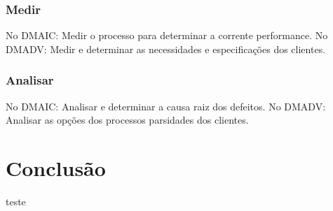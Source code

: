 \documentclass{abnt}
\begin{document}
				\subsection {Medir}
				No DMAIC: Medir o processo para determinar a corrente performance.
				No DMADV: Medir e determinar as necessidades e especificações dos clientes.
				\subsection {Analisar}
				No DMAIC: Analisar e determinar a causa raiz dos defeitos. 
				No DMADV: Analisar as opções dos processos parsidades dos clientes.
	
	\chapter {Conclusão}
	
	\begin{thebibliography}{99}
		 teste
	\end{thebibliography}
\end{document}
